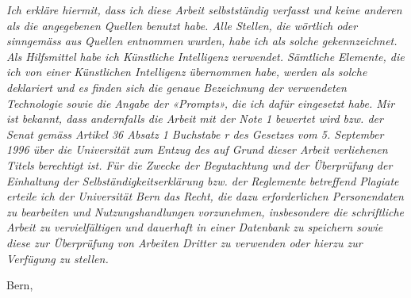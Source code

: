 {\textit{\glqq Ich erkl{\"a}re hiermit, dass ich diese Arbeit selbstst{\"a}ndig verfasst und keine anderen als die angegebenen Quellen benutzt habe. Alle Stellen, die w{\"o}rtlich oder sinngem{\"a}ss aus Quellen entnommen wurden, habe ich als solche gekennzeichnet. Als Hilfsmittel habe ich K{\"u}nstliche Intelligenz verwendet. S{\"a}mtliche Elemente, die ich von einer K{\"u}nstlichen Intelligenz \"{u}bernommen habe, werden als solche deklariert und es finden sich die genaue Bezeichnung der verwendeten Technologie sowie die Angabe der «Prompts», die ich daf{\"u}r eingesetzt habe. Mir ist bekannt, dass andernfalls die Arbeit mit der Note 1 bewertet wird bzw. der Senat gem{\"a}ss Artikel 36 Absatz 1 Buchstabe r des Gesetzes vom 5. September 1996 \"{u}ber die Universit{\"a}t zum Entzug des auf Grund dieser Arbeit verliehenen Titels berechtigt ist.\newline
F{\"u}r die Zwecke der Begutachtung und der {\"U}berpr{\"u}fung der Einhaltung der Selbst{\"a}ndigkeitserkl{\"a}rung bzw. der Reglemente betreffend Plagiate erteile ich der Universit{\"a}t Bern das Recht, die dazu erforderlichen Personendaten zu bearbeiten und Nutzungshandlungen vorzunehmen, insbesondere die schriftliche Arbeit zu vervielf{\"a}ltigen und dauerhaft in einer Datenbank zu speichern sowie diese zur {\"U}berpr{\"u}fung von Arbeiten Dritter zu verwenden oder hierzu zur Verf{\"u}gung zu stellen.\grqq{}}\par
		\vspace{1.5cm}
		\noindent\normalsize\normalfont
		{
			Bern, \thedate\par
		}\par
		\vspace{1.5cm}
		\noindent\normalsize\normalfont
		{
			\theauthor\par
		}\par
}\par